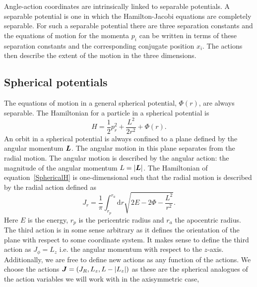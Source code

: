 \documentclass[useAMS,usenatbib,fleqn,a4paper]{mn2e}
\newcommand{\bs}[1]{\bmath{#1}}
\begin{document}
Angle-action coordinates are intrinsically linked to separable potentials. A separable potential is one in which the Hamilton-Jacobi equations are completely separable. For such a separable potential there are three separation constants and the equations of motion for the momenta $p_i$ can be written in terms of these separation constants and the corresponding conjugate position $x_i$. The actions then describe the extent of the motion in the three dimensions.

\subsection{Spherical potentials}
The equations of motion in a general spherical potential, $\Phi(r)$, are always separable. The Hamiltonian for a particle in a spherical potential is
\begin{equation}
H = \frac{1}{2}p_r^2 +\frac{L^2}{2r^2} + \Phi(r).
\label{SphericalH}
\end{equation}
An orbit in a spherical potential is always confined to a plane defined by the angular momentum $\bs{L}$. The angular motion in this plane separates from the radial motion. The angular motion is described by the angular action: the magnitude of the angular momentum $L=|\bs{L}|$. The Hamiltonian of equation~\ref{SphericalH} is one-dimensional such that the radial motion is described by the radial action defined as
\begin{equation}
J_r = \frac{1}{\pi}\int_{r_p}^{r_a}\mathrm{d}r\sqrt{2E-2\Phi-\frac{L^2}{r^2}}.
\end{equation}
Here $E$ is the energy, $r_p$ is the pericentric radius and $r_a$ the apocentric radius. The third action is in some sense arbitrary as it defines the orientation of the plane with respect to some coordinate system. It makes sense to define the third action as $J_\phi=L_z$ i.e. the angular momentum with respect to the $z$-axis. Additionally, we are free to define new actions as any function of the actions. We choose the actions $\bs{J}=(J_R,L_z,L-|L_z|)$ as these are the spherical analogues of the action variables we will work with in the axisymmetric case,
\end{document}
